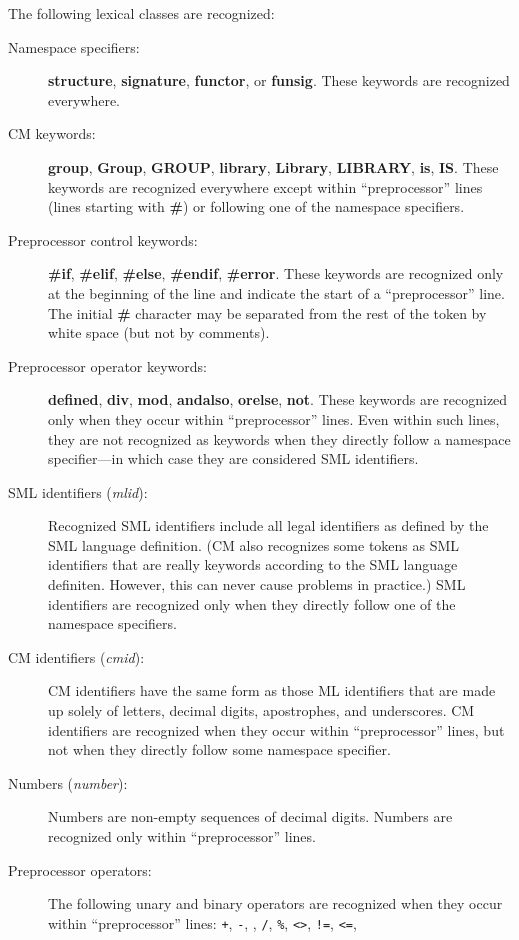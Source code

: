 \documentclass[titlepage,letterpaper]{article}
\newcommand{\nt}[1]{{\it #1}}
\begin{document}
The following lexical classes are recognized:

\begin{description}
\item[Namespace specifiers:] {\bf structure}, {\bf signature},
{\bf functor}, or {\bf funsig}.  These keywords are recognized
everywhere.
\item[CM keywords:] {\bf group}, {\bf Group}, {\bf GROUP}, {\bf
library}, {\bf Library}, {\bf LIBRARY}, {\bf is}, {\bf IS}.  These
keywords are recognized everywhere except within ``preprocessor''
lines (lines starting with {\bf \#}) or following one of the namespace
specifiers.
\item[Preprocessor control keywords:] {\bf \#if}, {\bf \#elif}, {\bf
\#else}, {\bf \#endif}, {\bf \#error}.  These keywords are recognized
only at the beginning of the line and indicate the start of a
``preprocessor'' line.  The initial {\bf \#} character may be
separated from the rest of the token by white space (but not by comments).
\item[Preprocessor operator keywords:] {\bf defined}, {\bf div}, {\bf
mod}, {\bf andalso}, {\bf orelse}, {\bf not}.  These keywords are
recognized only when they occur within ``preprocessor'' lines.  Even
within such lines, they are not recognized as keywords when they
directly follow a namespace specifier---in which case they are
considered SML identifiers.
\item[SML identifiers (\nt{mlid}):] Recognized SML identifiers
include all legal identifiers as defined by the SML language
definition. (CM also recognizes some tokens as SML identifiers that
are really keywords according to the SML language definiten. However,
this can never cause problems in practice.)  SML identifiers are
recognized only when they directly follow one of the namespace
specifiers.
\item[CM identifiers (\nt{cmid}):] CM identifiers have the same form
as those ML identifiers that are made up solely of letters, decimal
digits, apostrophes, and underscores.  CM identifiers are recognized when they
occur within ``preprocessor'' lines, but not when they directly follow
some namespace specifier.
\item[Numbers (\nt{number}):] Numbers are non-empty sequences of
decimal digits.  Numbers are recognized only within ``preprocessor''
lines.
\item[Preprocessor operators:] The following unary and binary operators are
recognized when they occur within ``preprocessor'' lines: {\tt +},
{\tt -}, {\tt *}, {\tt /}, {\tt \%}, {\tt <>}, {\tt !=}, {\tt <=},

\end{description}
\end{document}
